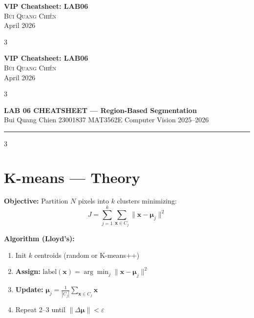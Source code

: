 \documentclass[9pt,landscape,a4paper]{extarticle}
\begin{document}
\begin{center}
    {\Large \bfseries VIP Cheatsheet: LAB06} \\
    \vspace{0.3cm}
    {\large \textsc{Bùi Quang Chiến}} \\
    \vspace{0.2cm}
    {\small April 2026}
\end{center}
\vspace{0.3cm}

\begin{multicols*}{3}

\begin{center}
    {\Large \bfseries VIP Cheatsheet: LAB06} \\
    \vspace{0.3cm}
    {\large \textsc{Bùi Quang Chiến}} \\
    \vspace{0.2cm}
    {\small April 2026}
\end{center}
\vspace{0.3cm}

\begin{multicols*}{3}

\begin{center}
  {\large\bfseries\color{hdr} LAB 06 CHEATSHEET --- Region-Based Segmentation} \\
  {\small Bui Quang Chien \textbullet{} 23001837 \textbullet{} MAT3562E Computer Vision 2025--2026}
\end{center}
\hrule\vspace{2pt}

\begin{multicols}{3}

\section{K-means --- Theory}

\textbf{Objective:} Partition $N$ pixels into $k$ clusters minimizing:
\[
  J = \sum_{j=1}^{k}\sum_{\mathbf{x}\in C_j}\lVert\mathbf{x}-\boldsymbol{\mu}_j\rVert^2
\]

\textbf{Algorithm (Lloyd's):}
\begin{enumerate}
  \item Init $k$ centroids (random or K-means++)
  \item \textbf{Assign:} $\text{label}(\mathbf{x})=\arg\min_j\lVert\mathbf{x}-\boldsymbol{\mu}_j\rVert^2$
  \item \textbf{Update:} $\boldsymbol{\mu}_j = \frac{1}{|C_j|}\sum_{\mathbf{x}\in C_j}\mathbf{x}$
  \item Repeat 2--3 until $\lVert\Delta\boldsymbol{\mu}\rVert < \varepsilon$
\end{enumerate}


\end{multicols}
\end{multicols*}
\end{multicols*}
\end{document}
